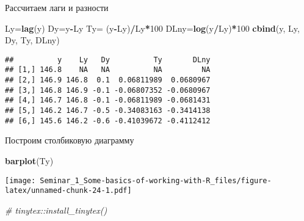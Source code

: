 \documentclass[
]{article}
\newenvironment{Shaded}{\begin{snugshade}}{\end{snugshade}}
\newcommand{\CommentTok}[1]{\textcolor[rgb]{0.56,0.35,0.01}{\textit{#1}}}
\newcommand{\DecValTok}[1]{\textcolor[rgb]{0.00,0.00,0.81}{#1}}
\newcommand{\FunctionTok}[1]{\textcolor[rgb]{0.13,0.29,0.53}{\textbf{#1}}}
\newcommand{\NormalTok}[1]{#1}
\newcommand{\OtherTok}[1]{\textcolor[rgb]{0.56,0.35,0.01}{#1}}
\newcommand{\SpecialCharTok}[1]{\textcolor[rgb]{0.81,0.36,0.00}{\textbf{#1}}}
\begin{document}
Рассчитаем лаги и разности

\begin{Shaded}
\begin{Highlighting}[]
\NormalTok{Ly}\OtherTok{=}\FunctionTok{lag}\NormalTok{(y)}
\NormalTok{Dy}\OtherTok{=}\NormalTok{y}\SpecialCharTok{{-}}\NormalTok{Ly}
\NormalTok{Ty}\OtherTok{=}\NormalTok{ (y}\SpecialCharTok{{-}}\NormalTok{Ly)}\SpecialCharTok{/}\NormalTok{Ly}\SpecialCharTok{*}\DecValTok{100}
\NormalTok{DLny}\OtherTok{=}\FunctionTok{log}\NormalTok{(y}\SpecialCharTok{/}\NormalTok{Ly)}\SpecialCharTok{*}\DecValTok{100}
\FunctionTok{cbind}\NormalTok{(y, Ly, Dy, Ty, DLny)}
\end{Highlighting}
\end{Shaded}

\begin{verbatim}
##          y    Ly   Dy          Ty       DLny
## [1,] 146.8    NA   NA          NA         NA
## [2,] 146.9 146.8  0.1  0.06811989  0.0680967
## [3,] 146.8 146.9 -0.1 -0.06807352 -0.0680967
## [4,] 146.7 146.8 -0.1 -0.06811989 -0.0681431
## [5,] 146.2 146.7 -0.5 -0.34083163 -0.3414138
## [6,] 145.6 146.2 -0.6 -0.41039672 -0.4112412
\end{verbatim}

Построим столбиковую диаграмму

\begin{Shaded}
\begin{Highlighting}[]
\FunctionTok{barplot}\NormalTok{(Ty)}
\end{Highlighting}
\end{Shaded}

\texttt{[image: Seminar\_1\_Some-basics-of-working-with-R\_files/figure-latex/unnamed-chunk-24-1.pdf]}

\begin{Shaded}
\begin{Highlighting}[]
\CommentTok{\# tinytex::install\_tinytex()}
\end{Highlighting}
\end{Shaded}
\end{document}
